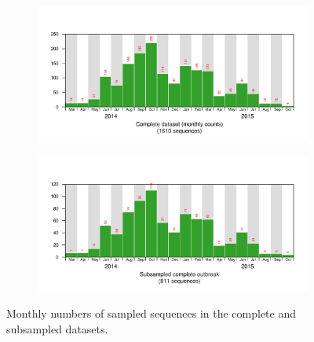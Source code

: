 	\begin{figure}[!p]
		\begin{subfigure}[b]{\textwidth}
			\centering
			\includegraphics[width=\columnwidth]{figures/complete-date-2}
		\end{subfigure}		
		\begin{subfigure}[b]{\textwidth}
			\centering
			\includegraphics[width=\columnwidth]{figures/special-subbig-date-2}
		\end{subfigure}
		\caption{Monthly numbers of sampled sequences in the complete and subsampled datasets.}
		\label{fig:seqdata_monthly}
	\end{figure}


